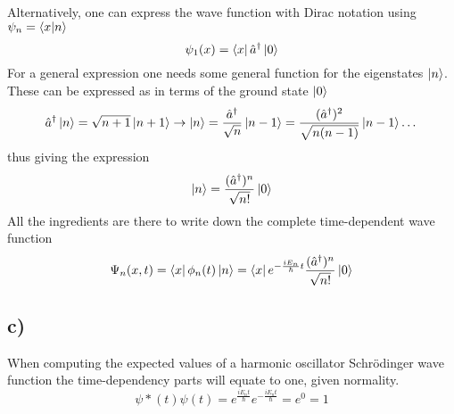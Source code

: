 \documentclass{article}
\begin{document}
Alternatively, one can express the wave function with Dirac notation using $\psi_n=\braket{x}{n}$
\begin{equation}
\psi_1(x) = \bra{x}\hat{a}^{\dagger}\ket{0}
\end{equation}
For a general expression one needs some general function for the eigenstates $\ket{n}$. These can be expressed as in terms of the ground state $\ket{0}$
\begin{equation*}
\hat{a}^{\dagger}\ket{n} = \sqrt{n+1}\ket{n+1} \rightarrow \ket{n}=\frac{\hat{a}^{\dagger}}{\sqrt{n}}\ket{n-1} = \frac{(\hat{a}^{\dagger})^2}{\sqrt{n(n-1)}}\ket{n-1} \dots
\end{equation*}
thus giving the expression
\begin{equation}
\ket{n} = \frac{(\hat{a}^{\dagger})^n}{\sqrt{n!}}\ket{0}
\end{equation}
All the ingredients are there to write down the complete time-dependent wave function
\begin{equation}
\Psi_n(x,t)=\bra{x}\phi_n(t)\ket{n}=\bra{x}e^{-\frac{i E_n }{\hbar}t}\frac{(\hat{a}^{\dagger})^n}{\sqrt{n!}}\ket{0}
\end{equation}

\subsection*{c)}

When computing the expected values of a harmonic oscillator Schrödinger wave function the time-dependency parts will equate to one, given normality.
\begin{equation*}
\psi*(t)\psi(t)=e^{\frac{iE_nt}{\hbar}}e^{-\frac{iE_nt}{\hbar}}=e^0=1
\end{equation*}
\end{document}
